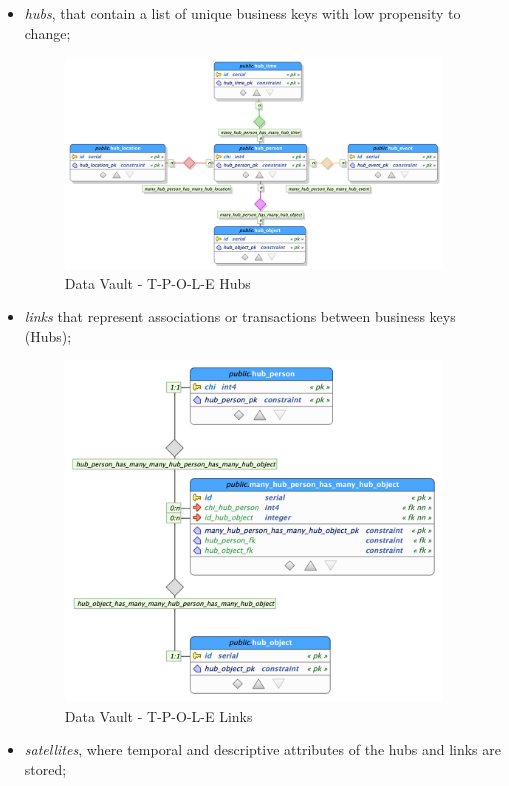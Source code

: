 \begin{itemize}
\item \emph{hubs}, that contain a list of unique business keys with low propensity to change;

\begin{figure}[H]
    \centering
    \includegraphics[width=10cm]{figures/technical/tpole_hubs.png}
    \caption{Data Vault - T-P-O-L-E Hubs}
    \label{fig:dvhubs}
\end{figure}

\item \emph{links} that represent associations or transactions between business keys (Hubs);

\begin{figure}[H]
    \centering
    \includegraphics[width=10cm]{figures/technical/links.png}
    \caption{Data Vault - T-P-O-L-E Links}
    \label{fig:dvlinks}
\end{figure}

\item \emph{satellites}, where temporal and descriptive attributes of the hubs and links are stored;


\end{itemize}
